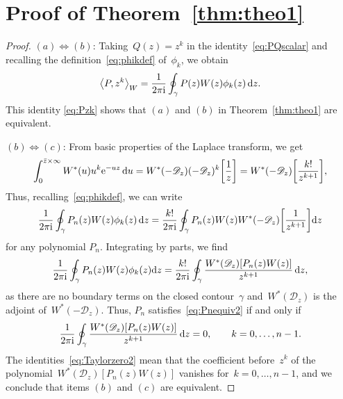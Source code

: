 \documentclass[pdftex]{sigma}
\numberwithin{equation}{section}
\begin{document}
 \section{Proof of Theorem~\ref{thm:theo1}}
 \label{section3}
 \begin{proof}%
 $(a) \Leftrightarrow (b)$: Taking~$Q(z) = z^k$ in the identity~\eqref{eq:PQscalar} and recalling the definition~\eqref{eq:phikdef} of~$\phi_k$, we obtain
 \begin{equation}
 \label{eq:Pzk}
 \big\langle P, z^k \big\rangle_W = \frac{1}{2\pi {\rm i}} \oint_\gamma P(z) W(z) \phi_k(z)\, {\rm d}z.
 \end{equation}
 This identity \eqref{eq:Pzk} shows that $(a)$ and $(b)$ in Theorem~\ref{thm:theo1}
 are equivalent.

\smallskip\noindent $(b) \Leftrightarrow (c)$:
 From basic properties of the Laplace transform, we get
 \begin{equation*}
 \int_{0}^{\bar z \times \infty} W^*(u) u^k {\rm e}^{-uz}\, {\rm d}u = W^*(-\mathscr{D}_z) (-\mathscr{D}_z)^k \bigg[\frac{1}{z}\bigg] = W^*(-\mathscr{D}_z) \bigg[\frac{k!}{z^{k+1}}\bigg],
 \end{equation*}
 Thus, recalling~\eqref{eq:phikdef}, we can write
 \begin{equation*}
 \frac{1}{2\pi {\rm i}} \oint_{\gamma} P_n(z) W(z) \phi_k(z)\, {\rm d}z = \frac{k!}{2\pi {\rm i}} \oint_{\gamma} P_n(z)W(z) W^*(-\mathscr{D}_z) \bigg[\frac{1}{z^{k+1}}\bigg] {\rm d}z
 \end{equation*}
 for any polynomial $P_n$. Integrating by parts, we find
 \begin{equation*}
 \frac{1}{2\pi {\rm i}} \oint_{\gamma} P_n(z) W(z) \phi_k(z) {\rm d}z = \frac{k!}{2\pi {\rm i}} \oint_{\gamma} \frac{W^*(\mathscr{D}_z)[P_n(z)W(z)]}{z^{k+1}} \, {\rm d}z,
 \end{equation*}
 as there are no boundary terms on the closed contour~$\gamma$ and~$W^*(\mathscr{D}_z)$ is the adjoint of~$W^*(-\mathscr{D}_z)$. Thus, $P_n$ satisfies~\eqref{eq:Pnequiv2} if and only if
 \begin{equation}
 \label{eq:Taylorzero2}
 \frac{1}{2\pi {\rm i}}
 \oint_{\gamma} \frac{W^*(\mathscr{D}_z)[P_n(z)W(z)]}{z^{k+1}} \, {\rm d}z =0, \qquad k =0, \dots, n-1.
 \end{equation}
 The identities~\eqref{eq:Taylorzero2} mean that the coefficient before~$z^k$ of the polynomial~$W^*(\mathscr{D}_z)[P_n(z)W(z)]$ vanishes for~$k=0, \dots, n-1$, and we conclude that items $(b)$ and $(c)$ are equivalent.


\end{proof}
\end{document}
